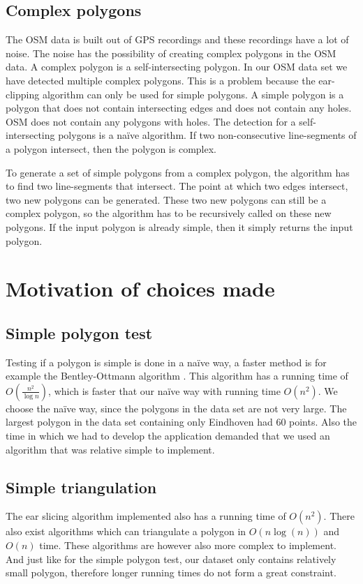 \subsection{Complex polygons}
\label{subsec:ComplexPolygons}
The OSM data is built out of GPS recordings and these recordings have a lot of noise. The noise has the possibility of creating complex polygons in the OSM data. A complex polygon is a self-intersecting polygon. In our OSM data set we have detected multiple complex polygons. This is a problem because the ear-clipping algorithm can only be used for simple polygons. A simple polygon is a polygon that does not contain intersecting edges and does not contain any holes. OSM does not contain any polygons with holes. The detection for a self-intersecting polygons is a naïve algorithm. If two non-consecutive line-segments of a polygon intersect, then the polygon is complex.

To generate a set of simple polygons from a complex polygon, the algorithm has to find two line-segments that intersect. The point at which two edges intersect, two new polygons can be generated. These two new polygons can still be a complex polygon, so the algorithm has to be recursively called on these new polygons. If the input polygon is already simple, then it simply returns the input polygon.

\section{Motivation of choices made}
\label{sec:MotivationOfChoicesMade}
\subsection{Simple polygon test}
\label{subsec:SimplePolygonTest}
Testing if a polygon is simple is done in a naïve way, a faster method is for example the Bentley-Ottmann algorithm \cite{Bentley79}. This algorithm has a running time of $O(\frac{n^2}{\log{n}})$, which is faster that our naïve way with running time $O(n^2)$. We choose the naïve way, since the polygons in the data set are not very large. The largest polygon in the data set containing only Eindhoven had 60 points. Also the time in which we had to develop the application demanded that we used an algorithm that was relative simple to implement.

\subsection{Simple triangulation}
\label{subsec:SimpleTriangulation}
The ear slicing algorithm implemented also has a running time of $O(n^2)$. There also exist algorithms which can triangulate a polygon in $O(n\log(n))$ and $O(n)$ time. These algorithms are however also more complex to implement. And just like for the simple polygon test, our dataset only contains relatively small polygon, therefore longer running times do not form a great constraint.
